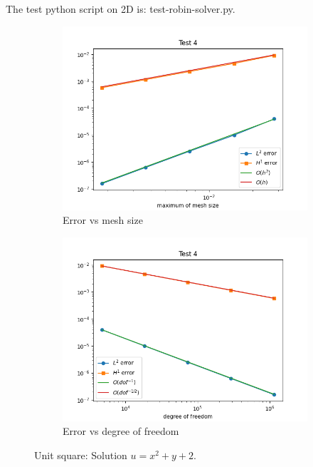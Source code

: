 \documentclass[12pt]{article}%
\theoremstyle{plain}
\numberwithin{equation}{section}
\begin{document}
The test python script on 2D is: test-robin-solver.py. 

\begin{figure}[H]%
    \centering
         \begin{subfigure}[h]{0.45\linewidth}
          \caption{Error vs mesh size}
\includegraphics[width=\linewidth]{figures/Ex1/Ex1_test.png}
\end{subfigure}
  \begin{subfigure}[h]{0.45\linewidth}
   \caption{Error vs degree of freedom}
\includegraphics[width=\linewidth]{figures/Ex1/Ex1_test_dof.png}
\end{subfigure}
  \caption{Unit square: Solution $u=x^2+y+2$.}
  \label{fig:Ex1_test}
 \end{figure}
\end{document}

